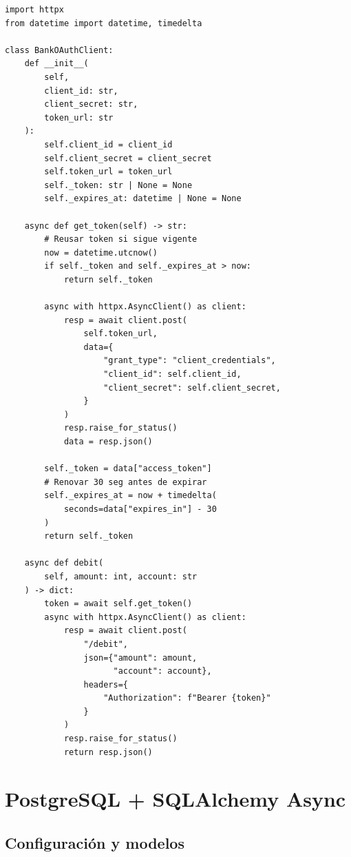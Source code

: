 \documentclass[11pt,a4paper]{article}
\begin{document}
\begin{pybox}
\begin{lstlisting}[style=python]
import httpx
from datetime import datetime, timedelta

class BankOAuthClient:
    def __init__(
        self,
        client_id: str,
        client_secret: str,
        token_url: str
    ):
        self.client_id = client_id
        self.client_secret = client_secret
        self.token_url = token_url
        self._token: str | None = None
        self._expires_at: datetime | None = None

    async def get_token(self) -> str:
        # Reusar token si sigue vigente
        now = datetime.utcnow()
        if self._token and self._expires_at > now:
            return self._token

        async with httpx.AsyncClient() as client:
            resp = await client.post(
                self.token_url,
                data={
                    "grant_type": "client_credentials",
                    "client_id": self.client_id,
                    "client_secret": self.client_secret,
                }
            )
            resp.raise_for_status()
            data = resp.json()

        self._token = data["access_token"]
        # Renovar 30 seg antes de expirar
        self._expires_at = now + timedelta(
            seconds=data["expires_in"] - 30
        )
        return self._token

    async def debit(
        self, amount: int, account: str
    ) -> dict:
        token = await self.get_token()
        async with httpx.AsyncClient() as client:
            resp = await client.post(
                "/debit",
                json={"amount": amount,
                      "account": account},
                headers={
                    "Authorization": f"Bearer {token}"
                }
            )
            resp.raise_for_status()
            return resp.json()
\end{lstlisting}
\end{pybox}

\section{PostgreSQL + SQLAlchemy Async}

\subsection{Configuración y modelos}
\end{document}
